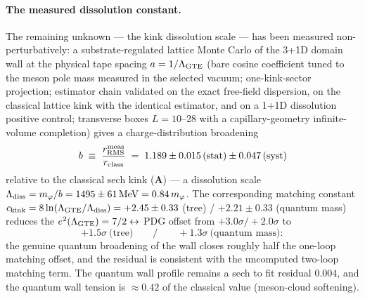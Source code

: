 \documentclass[11pt]{article}
\theoremstyle{remark}
\newcommand{\CatA}{\textbf{A}}
\begin{document}
\paragraph{The measured dissolution constant.}
The remaining unknown --- the kink dissolution scale --- has been measured
non-perturbatively: a substrate-regulated lattice Monte Carlo of the 3+1D
domain wall at the physical tape spacing $a = 1/\Lambda_{\rm GTE}$ (bare
cosine coefficient tuned to the meson pole mass measured in the selected
vacuum; one-kink-sector projection; estimator chain validated on the exact
free-field dispersion, on the classical lattice kink with the identical
estimator, and on a 1+1D dissolution positive control; transverse boxes
$L = 10$--$28$ with a capillary-geometry infinite-volume completion) gives a
charge-distribution broadening
\begin{equation}
  b \;\equiv\; \frac{r_{\rm RMS}^{\rm meas}}{r_{\rm class}}
  \;=\; 1.189 \pm 0.015\,\text{(stat)} \pm 0.047\,\text{(syst)}
  \label{eq:broadening}
\end{equation}
relative to the classical sech kink ($\CatA$) --- a dissolution scale
$\Lambda_{\rm diss} = m_\varphi/b = 1495 \pm 61\,\text{MeV} = 0.84\,
m_\varphi$.  The corresponding matching constant
$c_{\rm kink} = 8\ln(\Lambda_{\rm GTE}/\Lambda_{\rm diss}) = +2.45 \pm 0.33$
(tree) / $+2.21 \pm 0.33$ (quantum mass) reduces the
$e^2(\Lambda_{\rm GTE}) = 7/2 \leftrightarrow$ PDG offset from
$+3.0\sigma/+2.0\sigma$ to
\begin{equation}
  +1.5\sigma\ \text{(tree)} \qquad / \qquad +1.3\sigma\ \text{(quantum mass)}:
  \label{eq:coupling_verdict}
\end{equation}
the genuine quantum broadening of the wall closes roughly half the one-loop
matching offset, and the residual is consistent with the uncomputed two-loop
matching term.  The quantum wall profile remains a sech to fit residual
$0.004$, and the quantum wall tension is $\approx 0.42$ of the classical
value (meson-cloud softening).
\end{document}
